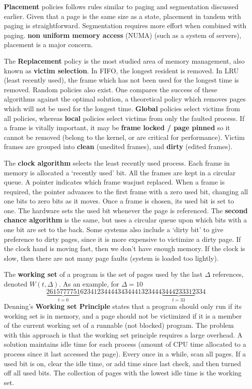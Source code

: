 {\bf Placement} policies follows rules similar to paging and segmentation discussed earlier. Given that a page is the same size as a state, placement in tandem with paging is straightforward. Segmentation requires more effort when combined with paging. {\bf non uniform memory access} (NUMA) (such as a system of servers), placement is a major concern.

The {\bf Replacement} policy is the most studied area of memory management, also known as {\bf victim selection}. In FIFO, the longest resident is removed. In LRU (least recently used), the frame which has not been used for the longest time is removed. Random policies also exist. One compares the success of these algorithms against the optimal solution, a theoretical policy which removes pages which will not be used for the longest time. {\bf Global} policies select victims from all policies, whereas {\bf local} policies select victims from only the faulted process. If a frame is vitally important, it may be {\bf frame locked / page pinned} so it cannot be removed (belong to the kernel, or are critical for performance). Victim frames are grouped into {\bf clean} (unedited frames), and {\bf dirty} (edited frames).

The {\bf clock algorithm} selects the least recently used process. Each frame in memory is allocated a `recently used' bit. All the frames are kept in a circular queue. A pointer indicates which frame wasjust replaced. When a frame is required, the pointer advances to the first frame with a zero used bit, changing all one bits to zero bits as it moves. Once a frame is chosen, its used bit is set to one. The hardware sets the used bit whenever the page is referenced. The {\bf second chance algorithm} is the same, but uses a circular queue upon which bits with a one bit are set to the back. Some systems also include a `dirty bit' to give preference to dirty pages, since it is more expensive to victimize a dirty page. If the clock hand is moving fast, then we don't have enough memory. If the clock is slow, then there are not many page faults (system is loaded too lightly).

The {\bf working set} of a program is the set of pages used by the last $\Delta$ references, denoted $W(t,\Delta)$. As an example, for $\Delta = 10$
%
\[ \underbrace{2615777751}_{t = 0}623412344443434441323444\underbrace{3444233312}_{t = 33}334 \]
%
Denning's {\bf Working set Principle} states that a program should only run if its working set is in memory, and a page should not be victimized if it is a member of the current working set of a runnable (not blocked) program. The problem with this approach is that the working set principle requires a large overhead. A solution maintains idle time for each process (amount of CPU time allocated to a process since it last accessed the page). Every once in a while, scan all pages. If a used bit is on, clear the idle time, or add time since last check, and then turned off all used bits. The collection of pages with the lowest idle time is the working set.

